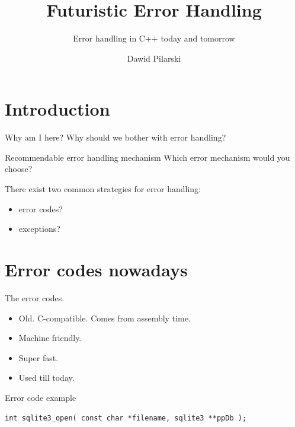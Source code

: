 \documentclass[10pt]{beamer}
\title{Futuristic Error Handling}
\subtitle{Error handling in C++ today and tomorrow}
\date{}
\author{Dawid Pilarski}
\institute{dawid.pilarski@panicsofware.com}
\begin{document}
\maketitle


\section{Introduction}

\begin{frame}{Why am I here?}
	Why should we bother with error handling?

\begin{frame}
	\tableofcontents
\end{frame}


\begin{frame}{Recommendable error handling mechanism}
	Which error mechanism would you choose?
	
	There exist two common strategies for error handling:
	\begin{itemize}
		\item error codes?
		\item exceptions?
	\end{itemize}
\end{frame}

\section{Error codes nowadays}
\begin{frame}{The error codes.}
	\begin{itemize}[<+- | alert@+>]
		\item Old. C-compatible. Comes from assembly time.
		\item Machine friendly.
		\item Super fast.
		\item Used till today.
	\end{itemize}
\end{frame}

\begin{frame}[fragile]{Error code example}
	\begin{verbatim}
int sqlite3_open( const char *filename, sqlite3 **ppDb );
	\end{verbatim}
	

\end{frame}
\end{frame}
\end{document}
